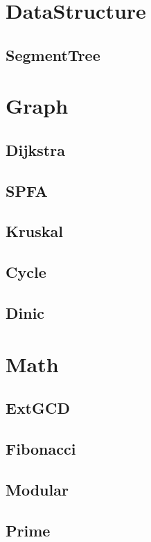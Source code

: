 \section{DataStructure}
\subsection{SegmentTree}



\section{Graph}
\subsection{Dijkstra}

\subsection{SPFA}

\subsection{Kruskal}

\subsection{Cycle}

\subsection{Dinic}



\section{Math}
\subsection{ExtGCD}

\subsection{Fibonacci}

\subsection{Modular}

\subsection{Prime}
